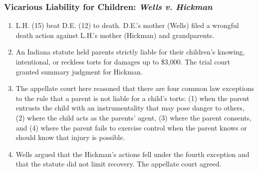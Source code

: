 \subsubsection{Vicarious Liability for Children: \emph{Wells v. Hickman}}

\begin{enumerate}
    \item L.H. (15) beat D.E. (12) to death. D.E.'s mother (Wells) filed a 
    wrongful death action against L.H.'s mother (Hickman) and grandparents.
    \item An Indiana statute held parents strictly liable for their children's 
    knowing, intentional, or reckless torts for damages up to \$3,000. The trial 
    court granted summary judgment for Hickman.
    \item The appellate court here reasoned that there are four common law 
    exceptions to the rule that a parent is not liable for a child's torts: (1) 
    when the parent entrusts the child with an instrumentality that may pose 
    danger to others, (2) where the child acts as the parents' agent, (3) where 
    the parent consents, and (4) where the parent fails to exercise control when 
    the parent knows or should know that injury is possible.
    \item Wells argued that the Hickman's actions fell under the fourth 
    exception and that the statute did not limit recovery. The appellate court 
    agreed.
\end{enumerate}
